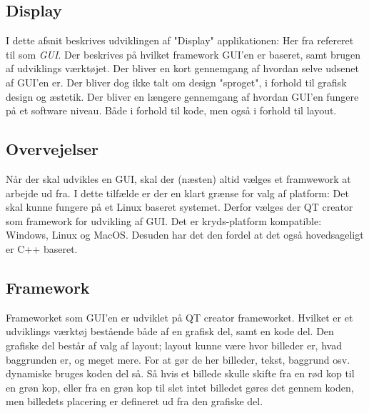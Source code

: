 \documentclass[Softwaredesign/Softwaredesign_main.tex]{subfiles}
\begin{document}
\subsection{Display}
I dette afsnit beskrives udviklingen af "Display" applikationen: Her fra refereret til som \textit{GUI}. Der beskrives på hvilket framework GUI'en er baseret, samt brugen af udviklings værktøjet. Der bliver en kort gennemgang af hvordan selve udsenet af GUI'en er.  Der bliver dog ikke talt om design "sproget", i forhold til grafisk design og æstetik. Der bliver en længere gennemgang af hvordan GUI'en fungere på et software niveau. Både i forhold til kode, men også i forhold til layout.

\subsection{Overvejelser}
Når der skal udvikles en GUI, skal der (næsten) altid vælges et framwework at arbejde ud fra. I dette tilfælde er der en klart grænse for valg af platform: Det skal kunne fungere på et Linux baseret systemet. Derfor vælges der QT creator som framework for udvikling af GUI. Det er kryds-platform kompatible: Windows, Linux og MacOS. Desuden har det den fordel at det også hovedsageligt er C++ baseret. 


\subsection{Framework}
Frameworket som GUI'en er udviklet på QT creator frameworket. Hvilket er et udviklings værktøj bestående både af en grafisk del, samt en kode del. Den grafiske del består af valg af layout; layout kunne være hvor billeder er, hvad baggrunden er, og meget mere. For at gør de her billeder, tekst, baggrund osv. dynamiske bruges koden del så. Så hvis et billede skulle skifte fra en rød kop til en grøn kop, eller fra en grøn kop til slet intet billedet gøres det gennem koden, men billedets placering er defineret ud fra den grafiske del. 
\end{document}
